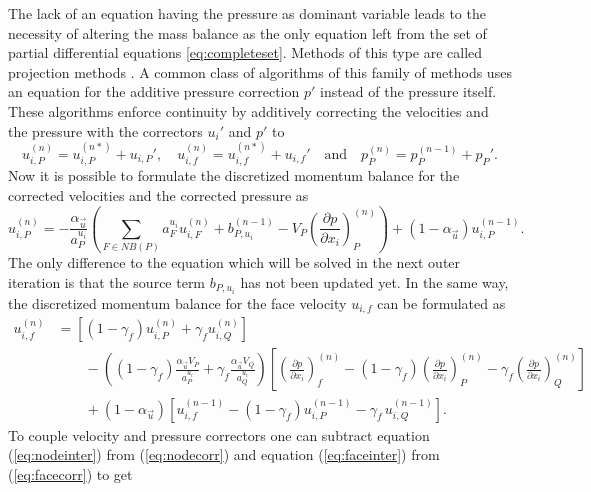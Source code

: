 The lack of an equation having the pressure as dominant variable leads to the necessity of altering the mass balance as the only equation left from the set of partial differential equations \ref{eq:completeset}. Methods of this type are called projection methods \cite{ferziger02}. A common class of algorithms of this family of methods uses an equation for the additive pressure correction \(p'\) instead of the pressure itself. These algorithms enforce continuity by additively correcting the velocities and the pressure with the correctors \(u_i'\) and \(p'\) to
\begin{displaymath}
  u_{i,P}^{(n)} =  u_{i,P}^{(n*)}  + u_{i,P}',\quad u_{i,f}^{(n)} =  u_{i,f}^{(n*)}  + u_{i,f}' \quad \text{and} \quad   p_P^{(n)} =  p_P^{(n-1)}  + p_P'.
\end{displaymath}
Now it is possible to formulate the discretized momentum balance for the corrected velocities and the corrected pressure as
\begin{equation}
  \label{eq:nodecorr}
  u_{i,P}^{(n)} 
  = 
  - \frac{\alpha_{\vec{u}}}{a_P^{u_i}} \left(\sum_{F \in NB(P)} a_F^{u_i} u_{i,F}^{(n)}
  +                                     b_{P,u_i}^{(n-1)} 
  -                                     V_P\left(\frac{\partial p}{\partial x_i}\right)_P^{(n)} \right)
  + \left(1 - \alpha_{\vec{u}}\right) u_{i,P}^{(n-1)}.
\end{equation}
The only difference to the equation which will be solved in the next outer iteration is that the source term \(b_{P,u_i}\) has not been updated yet. In the same way, the discretized momentum balance for the face velocity \(u_{i,f}\) can be formulated as
\begin{align}
  \label{eq:facecorr}
  u_{i,f}^{(n)} 
  &=
  \left[\left(1 - \gamma_f\right) u_{i,P}^{(n)} + \gamma_f u_{i,Q}^{(n)} \right] \nonumber\\[1em]
  &\quad\quad - 
  \left(\left(1 - \gamma_f\right) \frac{\alpha_\vec{u} V_P}{a_P^{u_i}} + \gamma_f \frac{\alpha_\vec{u} V_Q}{a_Q^{u_i}}\right)
  \left[ 
  \left(\frac{\partial p}{\partial x_i}\right)_f^{(n)} 
  -  \left(1 - \gamma_f\right) \left( \frac{\partial p}{\partial x_i} \right)_P^{(n)} 
  - \gamma_f \left(\frac{\partial p}{\partial x_i}\right)_Q^{(n)} 
  \right] \nonumber \\[1em]
  &\quad\quad + \left(1 - \alpha_\vec{u}\right) \left[ u_{i,f}^{(n-1)} - \left(1 - \gamma_f\right) u_{i,P}^{(n-1)} - \gamma_f \, u_{i,Q}^{(n-1)} \right].
\end{align}
To couple velocity and pressure correctors one can subtract equation (\ref{eq:nodeinter}) from (\ref{eq:nodecorr}) and equation (\ref{eq:faceinter}) from (\ref{eq:facecorr}) to get
